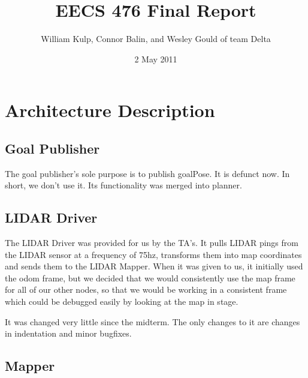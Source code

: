 \documentclass{article}
\author{William Kulp, Connor Balin, and Wesley Gould of team Delta}
\title{EECS 476 Final Report}
\date{2 May 2011}
\begin{document}
\maketitle

\small
\section{Architecture Description}

\subsection{Goal Publisher}

The goal publisher's sole purpose is to publish goalPose.
It is defunct now.
In short, we don't use it.
Its functionality was merged into planner.


\subsection{LIDAR Driver}

The LIDAR Driver was provided for us by the TA's.
It pulls LIDAR pings from the LIDAR sensor at a frequency of 75hz, transforms them into map coordinates and sends them to the LIDAR Mapper.
When it was given to us, it initially used the odom frame, but we decided that we would consistently use the map frame for all of our other nodes, so that we would be working in a consistent frame which could be debugged easily by looking at the map in stage.

It was changed very little since the midterm. The only changes to it are changes in indentation and minor bugfixes.


\subsection{Mapper}
\end{document}
